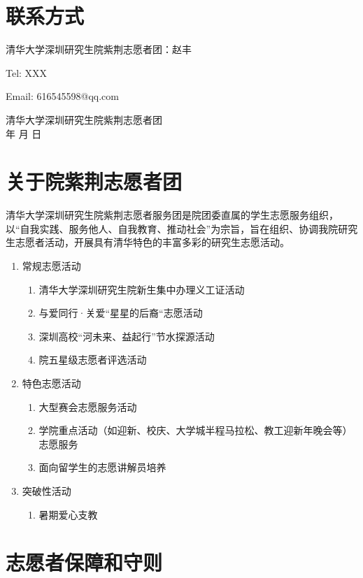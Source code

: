 \documentclass[12pt]{ctexart}
\begin{document}
\section{联系方式}
清华大学深圳研究生院紫荆志愿者团：赵丰

Tel: XXX

Email: 616545598@qq.com
\begin{flushright}
清华大学深圳研究生院紫荆志愿者团\\
\the\year 年 \the\month 月 \the\day 日
\end{flushright}
\begin{appendix}
\section{关于院紫荆志愿者团}
清华大学深圳研究生院紫荆志愿者服务团是院团委直属的学生志愿服务组织，以“自我实践、服务他人、自我教育、推动社会”为宗旨，旨在组织、协调我院研究生志愿者活动，开展具有清华特色的丰富多彩的研究生志愿活动。
\begin{enumerate}[label = {\chinese*、}]
\item 常规志愿活动
\begin{enumerate}[label =(\arabic*)]
         \item  清华大学深圳研究生院新生集中办理义工证活动
         \item 与爱同行·关爱“星星的后裔“志愿活动
         \item  深圳高校“河未来、益起行”节水探源活动
         \item 院五星级志愿者评选活动
\end{enumerate}
\item 特色志愿活动
\begin{enumerate}[label =(\arabic*)]
        \item 大型赛会志愿服务活动
        \item 学院重点活动（如迎新、校庆、大学城半程马拉松、教工迎新年晚会等）志愿服务
        \item 面向留学生的志愿讲解员培养
\end{enumerate}
\item 突破性活动
\begin{enumerate}[label =(\arabic*)]
         \item 暑期爱心支教
\end{enumerate}
\end{enumerate}
\section{志愿者保障和守则}

\end{appendix}
\end{document}
